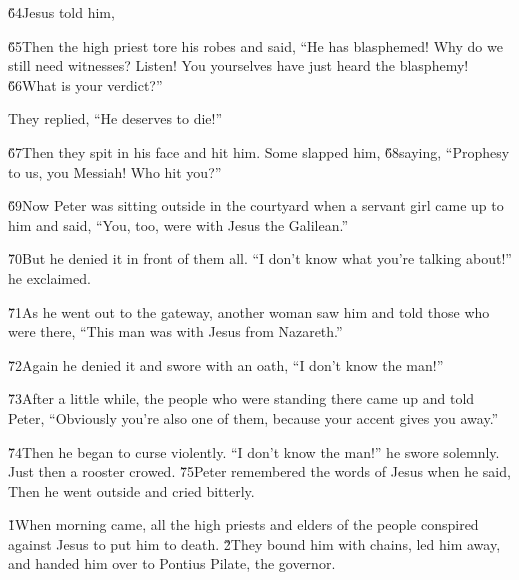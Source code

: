 \v{64}Jesus told him,  

\v{65}Then the high priest tore his robes and said, ``He has blasphemed! Why do we still need witnesses? Listen! You yourselves have just heard the blasphemy! \v{66}What is your verdict?''

They replied, ``He deserves to die!''

\v{67}Then they spit in his face and hit him. Some slapped him, \v{68}saying, ``Prophesy to us, you Messiah! Who hit you?''

\v{69}Now Peter was sitting outside in the courtyard when a servant girl came up to him and said, ``You, too, were with Jesus the Galilean.''

\v{70}But he denied it in front of them all. ``I don't know what you're talking about!'' he exclaimed.

\v{71}As he went out to the gateway, another woman saw him and told those who were there, ``This man was with Jesus from Nazareth.''

\v{72}Again he denied it and swore with an oath, ``I don't know the man!''

\v{73}After a little while, the people who were standing there came up and told Peter, ``Obviously you're also one of them, because your accent gives you away.''

\v{74}Then he began to curse violently. ``I don't know the man!'' he swore solemnly. Just then a rooster crowed. \v{75}Peter remembered the words of Jesus when he said,  Then he went outside and cried bitterly.

\v{1}When morning came, all the high priests and elders of the people conspired against Jesus to put him to death. \v{2}They bound him with chains, led him away, and handed him over to Pontius Pilate, the governor.

